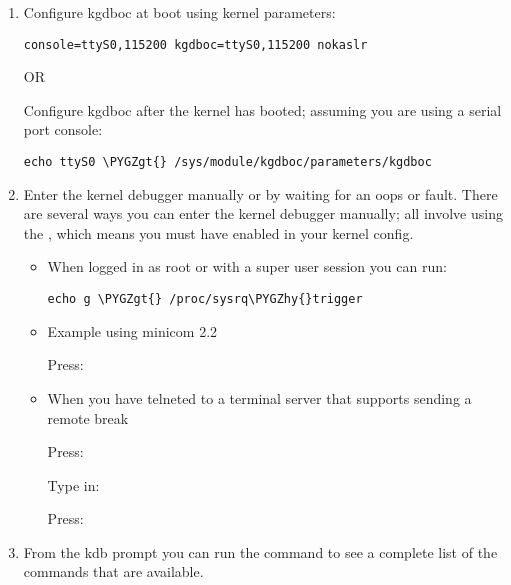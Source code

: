 \documentclass[a4paper,8pt,english]{sphinxmanual}
\def\PYGZgt{\char`\>}
\def\PYGZhy{\char`\-}
\begin{document}
\begin{enumerate}
\item {} 
Configure kgdboc at boot using kernel parameters:

\begin{Verbatim}[commandchars=\\\{\}]
console=ttyS0,115200 kgdboc=ttyS0,115200 nokaslr
\end{Verbatim}

OR

Configure kgdboc after the kernel has booted; assuming you are using
a serial port console:

\begin{Verbatim}[commandchars=\\\{\}]
echo ttyS0 \PYGZgt{} /sys/module/kgdboc/parameters/kgdboc
\end{Verbatim}

\item {} 
Enter the kernel debugger manually or by waiting for an oops or
fault. There are several ways you can enter the kernel debugger
manually; all involve using the , which means you must have
enabled  in your kernel config.
\begin{itemize}
\item {} 
When logged in as root or with a super user session you can run:

\begin{Verbatim}[commandchars=\\\{\}]
echo g \PYGZgt{} /proc/sysrq\PYGZhy{}trigger
\end{Verbatim}

\item {} 
Example using minicom 2.2

Press:   

\item {} 
When you have telneted to a terminal server that supports sending
a remote break

Press: \sphinxcode{CTRL-{]}}

Type in: 

Press:  

\end{itemize}

\item {} 
From the kdb prompt you can run the  command to see a complete
list of the commands that are available.


\end{enumerate}
\end{document}
